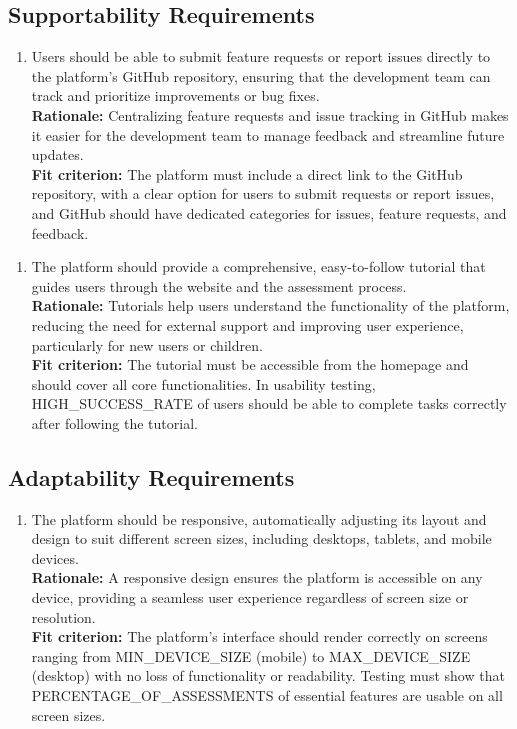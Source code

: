 \documentclass[12pt]{article}
\begin{document}
\subsection{Supportability Requirements}
\begin{enumerate}[label={MS-SR}1. ]
  \item Users should be able to submit feature requests or report issues directly to the platform’s GitHub repository, ensuring that the development team can track and prioritize improvements or bug fixes.\\
  \textbf{Rationale: }Centralizing feature requests and issue tracking in GitHub makes it easier for the development team to manage feedback and streamline future updates.\\
  \textbf{Fit criterion: }The platform must include a direct link to the GitHub repository, with a clear option for users to submit requests or report issues, and GitHub should have dedicated categories for issues, 
  feature requests, and feedback.
\end{enumerate}
\begin{enumerate}[label={MS-SR}2. ]
  \item The platform should provide a comprehensive, easy-to-follow tutorial that guides users through the website and the assessment process.\\
  \textbf{Rationale: }Tutorials help users understand the functionality of the platform, reducing the need for external support and improving user experience, particularly for new users or children.\\
  \textbf{Fit criterion: }The tutorial must be accessible from the homepage and should cover all core functionalities. In usability testing, HIGH\_SUCCESS\_RATE of users should be able to complete tasks correctly after following the
   tutorial.
\end{enumerate}

\subsection{Adaptability Requirements}
\begin{enumerate}[label={MS-AR}1. ]
  \item The platform should be responsive, automatically adjusting its layout and design to suit different screen sizes, including desktops, tablets, and mobile devices.\\
  \textbf{Rationale: }A responsive design ensures the platform is accessible on any device, providing a seamless user experience regardless of screen size or resolution.\\
  \textbf{Fit criterion: }The platform’s interface should render correctly on screens ranging from MIN\_DEVICE\_SIZE (mobile) to MAX\_DEVICE\_SIZE (desktop) with no loss of functionality or readability. Testing must show that\\ PERCENTAGE\_OF\_ASSESSMENTS of essential 
  features are usable on all screen sizes.
\end{enumerate}
\end{document}
